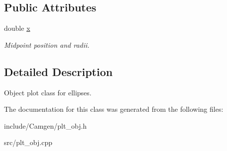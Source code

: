 \subsection*{Public Attributes}
\begin{DoxyCompactItemize}
\item 
\hypertarget{a00428_a280bea0c59d94c0187fb41013d8ab974}{}double \hyperlink{a00428_a280bea0c59d94c0187fb41013d8ab974}{x}\label{a00428_a280bea0c59d94c0187fb41013d8ab974}

\begin{DoxyCompactList}\small\item\em Midpoint position and radii. \end{DoxyCompactList}\end{DoxyCompactItemize}


\subsection{Detailed Description}
Object plot class for ellipses. 

The documentation for this class was generated from the following files\+:\begin{DoxyCompactItemize}
\item 
include/\+Camgen/plt\+\_\+obj.\+h\item 
src/plt\+\_\+obj.\+cpp\end{DoxyCompactItemize}
